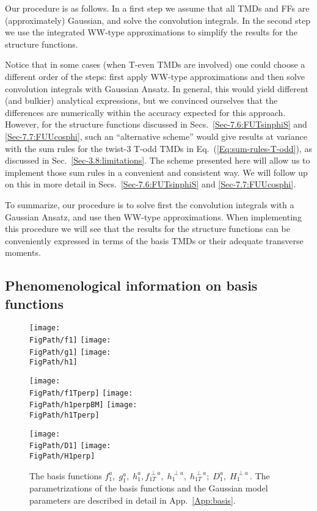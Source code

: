 \documentclass[a4paper,11pt]{article}
\newcommand*{\FigPath}{./figs}%
\begin{document}
Our procedure is as follows. In a first step we assume that all TMDs and
FFs are (approximately) Gaussian, and solve the convolution integrals.
In the second step we use the integrated WW-type approximations to
simplify the results for the structure functions.

Notice that in some cases (when T-even TMDs are involved)
one could choose a different order of the steps: first apply
WW-type approximations and then solve convolution integrals
with Gaussian Ansatz.
In general, this would yield different (and bulkier) analytical
expressions, but we convinced ourselves that the differences
are numerically within the accuracy expected for this approach.
However, for the structure functions discussed in
Secs.~\ref{Sec-7.6:FUTsinphiS} and \ref{Sec-7.7:FUUcosphi},
such an ``alternative scheme'' would give results at
variance with the sum rules for the twist-3 T-odd TMDs
in Eq.~(\ref{Eq:sum-rules-T-odd}), as discussed in
Sec.~\ref{Sec-3.8:limitations}.
The scheme presented here will allow us to implement those sum
rules in a convenient and consistent way. We will follow up on
this in more detail in
Secs.~\ref{Sec-7.6:FUTsinphiS} and \ref{Sec-7.7:FUUcosphi}.

To summarize, our procedure is to solve first the convolution
integrals with a Gaussian Ansatz, and use then WW-type approximations.
When implementing this procedure we will see that the results
for the structure functions can be conveniently expressed in
terms of the basis TMDs or their adequate transverse moments.

\subsection{Phenomenological information on basis functions}
\label{Sec-4.3:plot-basis-functions}

\begin{figure}[b!]
\centering
\texttt{[image: \\FigPath/f1]}
\texttt{[image: \\FigPath/g1]}
\texttt{[image: \\FigPath/h1]}

\texttt{[image: \\FigPath/f1Tperp]}
\texttt{[image: \\FigPath/h1perpBM]}
\texttt{[image: \\FigPath/h1Tperp]}

\texttt{[image: \\FigPath/D1]}
\texttt{[image: \\FigPath/H1perp]}
\caption{\label{basis}
	The basis functions $f_1^a, \; g_1^a, \; h_1^a,
	f_{1T}^{\perp a}, \;h_1^{\perp a},\; h_{1T}^{\perp a}; \;
	D_1^a, \; H_1^{\perp a} \,$.
	The parametrizations of the basis functions and the Gaussian
	model parameters are described in detail in App.~\ref{App:basis}.}
\end{figure}
\end{document}
